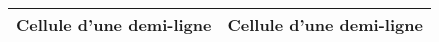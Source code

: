 \begin{tabular}{|p{0.5\linewidth}|p{0.5\linewidth}|}
	\hline 
	Cellule d'une demi-ligne & Cellule d'une demi-ligne\\
	\hline 
\end{tabular}
